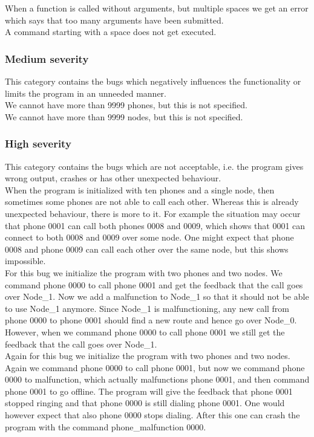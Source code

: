 \documentclass{article}
\begin{document}
When a function is called without arguments, but multiple spaces we get an error which says that too many arguments have been submitted.
\\

A command starting with a space does not get executed.

\subsubsection{Medium severity}
This category contains the bugs which negatively influences the functionality or limits the program in an unneeded manner.
\\

We cannot have more than 9999 phones, but this is not specified.
\\

We cannot have more than 9999 nodes, but this is not specified.

\subsubsection{High severity}
This category contains the bugs which are not acceptable, i.e. the program gives wrong output, crashes or has other unexpected behaviour.
\\

When the program is initialized with ten phones and a single node, then sometimes some phones are not able to call each other. Whereas this is already unexpected behaviour, there is more to it. For example the situation may occur that phone 0001 can call both phones 0008 and 0009, which shows that 0001 can connect to both 0008 and 0009 over some node. One might expect that phone 0008 and phone 0009 can call each other over the same node, but this shows impossible.
\\

For this bug we initialize the program with two phones and two nodes. We command phone 0000 to call phone 0001 and get the feedback that the call goes over Node\_1. Now we add a malfunction to Node\_1 so that it should not be able to use Node\_1 anymore. Since Node\_1 is malfunctioning, any new call from phone 0000 to phone 0001 should find a new route and hence go over Node\_0. However, when we command phone 0000 to call phone 0001 we still get the feedback that the call goes over Node\_1.
\\

Again for this bug we initialize the program with two phones and two nodes. Again we command phone 0000 to call phone 0001, but now we command phone 0000 to malfunction, which actually malfunctions phone 0001, and then command phone 0001 to go offline. The program will give the feedback that phone 0001 stopped ringing and that phone 0000 is still dialing phone 0001. One would however expect that also phone 0000 stops dialing. After this one can crash the program with the command phone\_malfunction 0000.
\\
\end{document}
